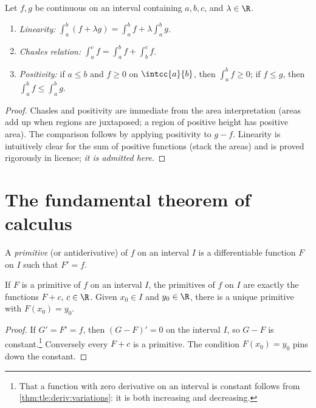 \begin{proposition}\label{prop:tle:integ:properties}
Let $f, g$ be continuous on an interval containing $a, b, c$, and
$\lambda \in \R$.
\begin{enumerate}
  \item \emph{Linearity:}
        $\displaystyle\int_a^b (f + \lambda g) = \int_a^b f + \lambda \int_a^b g$.
  \item \emph{Chasles relation:}
        $\displaystyle\int_a^c f = \int_a^b f + \int_b^c f$.
  \item \emph{Positivity:} if $a \leq b$ and $f \geq 0$ on $\intcc{a}{b}$,
        then $\displaystyle\int_a^b f \geq 0$; if $f \leq g$, then
        $\displaystyle\int_a^b f \leq \int_a^b g$.
\end{enumerate}
\end{proposition}

\begin{proof}
Chasles and positivity are immediate from the area interpretation (areas add
up when regions are juxtaposed; a region of positive height has positive
area). The comparison follows by applying positivity to $g - f$. Linearity is
intuitively clear for the sum of positive functions (stack the areas) and is
proved rigorously in licence; \emph{it is admitted here}.
\end{proof}

\section{The fundamental theorem of calculus}

\begin{definition}[Primitive]\label{def:tle:integ:primitive}
A \emph{primitive} (or antiderivative) of $f$ on an interval
$I$ is a differentiable function $F$ on $I$ such that $F' = f$.
\end{definition}

\begin{proposition}\label{prop:tle:integ:primunique}
If $F$ is a primitive of $f$ on an interval $I$, the primitives of $f$ on
$I$ are exactly the functions $F + c$, $c \in \R$. Given $x_0 \in I$ and
$y_0 \in \R$, there is a unique primitive with $F(x_0) = y_0$.
\end{proposition}

\begin{proof}
If $G' = F' = f$, then $(G - F)' = 0$ on the interval $I$, so $G - F$ is
constant.\footnote{That a function with zero derivative on an interval is
constant follows from \cref{thm:tle:deriv:variations}: it is both increasing
and decreasing.} Conversely every $F + c$ is a primitive. The condition
$F(x_0) = y_0$ pins down the constant.
\end{proof}

